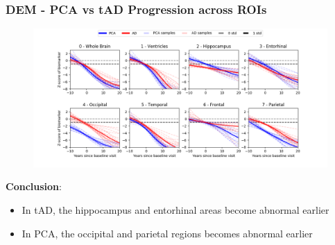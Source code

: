 \documentclass[10pt,xcolor=table]{beamer}
\begin{document}
\begin{frame}
\frametitle{DEM - PCA vs tAD Progression across ROIs}


\begin{figure}
 \hspace{-1cm}
 \includegraphics[scale=0.33, trim=0 0 0 30,clip=true]{../images/dem/mriSmallSebPaper_DEMStd_subplotsPcaAd.png}
 \label{trajDEMPcaAd}
\end{figure}

\textbf{Conclusion}: 
\begin{itemize}
 \item In tAD, the hippocampus and entorhinal areas become abnormal earlier
 \item In PCA, the occipital and parietal regions becomes abnormal earlier
\end{itemize}


\end{frame}
\end{document}

